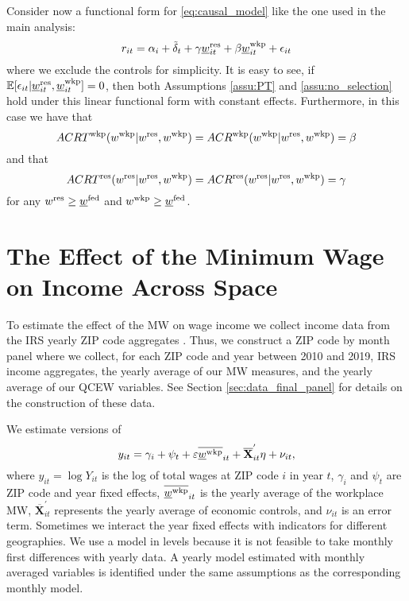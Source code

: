 Consider now a functional form for \eqref{eq:causal_model} like the one used in 
the main analysis:
$$
r_{it} = \alpha_i + \tilde\delta_t 
         + \gamma \underline{w}_{it}^{\text{res}} + \beta \underline{w}_{it}^{\text{wkp}}
         + \epsilon_{it}
$$
where we exclude the controls for simplicity.
It is easy to see, if 
$\operatorname{\mathbb{E}}[\epsilon_{it} | \underline{w}_{it}^{\text{res}}, \underline{w}_{it}^{\text{wkp}}] = 0$,
then both Assumptions \ref{assu:PT} and \ref{assu:no_selection} hold under 
this linear functional form with constant effects.
Furthermore, in this case we have that
\begin{equation*}
    ACRT^{\text{wkp}}(w^{\text{wkp}} | w^{\text{res}}, w^{\text{wkp}}) 
        = ACR^{\text{wkp}}(w^{\text{wkp}} | w^{\text{res}}, w^{\text{wkp}}) 
        = \beta
\end{equation*}
and that
\begin{equation*}
    ACRT^{\text{res}}(w^{\text{res}} | w^{\text{res}}, w^{\text{wkp}})
        = ACR^{\text{res}}(w^{\text{res}} | w^{\text{res}}, w^{\text{wkp}})
        = \gamma
\end{equation*}
for any $w^{\text{res}}\geq\underline{w}^{\text{fed}}$ and $w^{\text{wkp}}\geq\underline{w}^{\text{fed}}$.

\clearpage
\section{The Effect of the Minimum Wage on Income Across Space}
\label{sec:mw_on_income}

To estimate the effect of the MW on wage income we collect income data from the 
IRS yearly ZIP code aggregates \textcite{IRS}.
Thus, we construct a ZIP code by month panel where we collect, for each ZIP code
and year between 2010 and 2019, IRS income aggregates, the yearly average of our 
MW measures, and the yearly average of our QCEW variables. 
See Section \ref{sec:data_final_panel} for details on the construction of these 
data.

We estimate versions of
\begin{equation}\label{eq:wage_level_model}
    y_{it} = \gamma_i + \psi_t + \varepsilon \overline{\underline{w}^{\text{wkp}}}_{it} + 
             \overline{\mathbf{X}}^{'}_{it} \eta + \nu_{it} ,
\end{equation}
where 
$y_{it} = \log Y_{it}$ is the log of total wages at ZIP code $i$ in year $t$,
$\gamma_i$ and $\psi_t$ are ZIP code and year fixed effects,
$\overline{\underline{w}^{\text{wkp}}}_{it}$ is the yearly average of the workplace MW,
$\overline{\mathbf{X}}^{'}_{it}$ represents the yearly average of economic 
controls, and
$\nu_{it}$ is an error term.
Sometimes we interact the year fixed effects with indicators for different
geographies.
We use a model in levels because it is not feasible to take monthly first 
differences with yearly data.
A yearly model estimated with monthly averaged variables is identified under the 
same assumptions as the corresponding monthly model.

